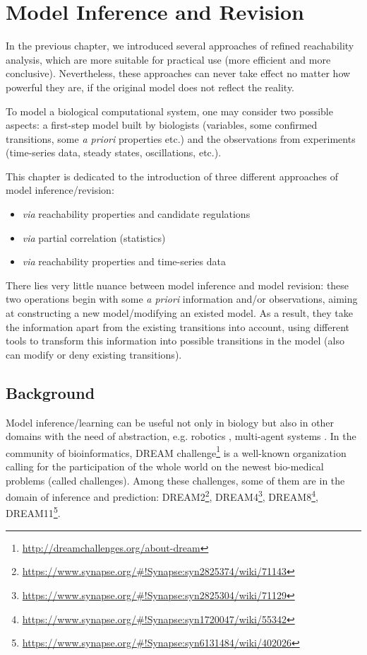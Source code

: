 \chapter{Model Inference and Revision}\label{chap:modelInference}
\begin{mybox}
In the previous chapter, we introduced several approaches of refined reachability analysis, which are more suitable for practical use (more efficient and more conclusive).
Nevertheless, these approaches can never take effect no matter how powerful they are, if the original model does not reflect the reality.

To model a biological computational system, one may consider two possible aspects: a first-step model built by biologists (variables, some confirmed transitions, some \textit{a priori} properties etc.) and the observations from experiments (time-series data, steady states, oscillations, etc.).

This chapter is dedicated to the introduction of three different approaches of model inference/revision:

\begin{itemize}
    \item \textit{via} reachability properties and candidate regulations
    \item \textit{via} partial correlation (statistics)
    \item \textit{via} reachability properties and time-series data
\end{itemize}

There lies very little nuance between model inference and model revision: these two operations begin with some \textit{a priori} information and/or observations, aiming at constructing a new model/modifying an existed model.
As a result, they take the information apart from the existing transitions into account, using different tools to transform this information into possible transitions in the model (also can modify or deny existing transitions).

\end{mybox}

\section{Background}
Model inference/learning can be useful not only in biology \cite{ribeiro2015learning} but also in other domains with the need of abstraction, e.g. robotics \cite{nguyen2011model}, multi-agent systems \cite{foerster2016learning}.
In the community of bioinformatics, DREAM  challenge\footnote{\url{http://dreamchallenges.org/about-dream}} is a well-known organization calling for the participation of the whole world on the newest bio-medical problems (called challenges). 
Among these challenges, some of them are in the domain of inference and prediction:
DREAM2\footnote{\url{https://www.synapse.org/\#!Synapse:syn2825374/wiki/71143}},
DREAM4\footnote{\url{https://www.synapse.org/\#!Synapse:syn2825304/wiki/71129}},
DREAM8\footnote{\url{https://www.synapse.org/\#!Synapse:syn1720047/wiki/55342}},
DREAM11\footnote{\url{https://www.synapse.org/\#!Synapse:syn6131484/wiki/402026}}.


